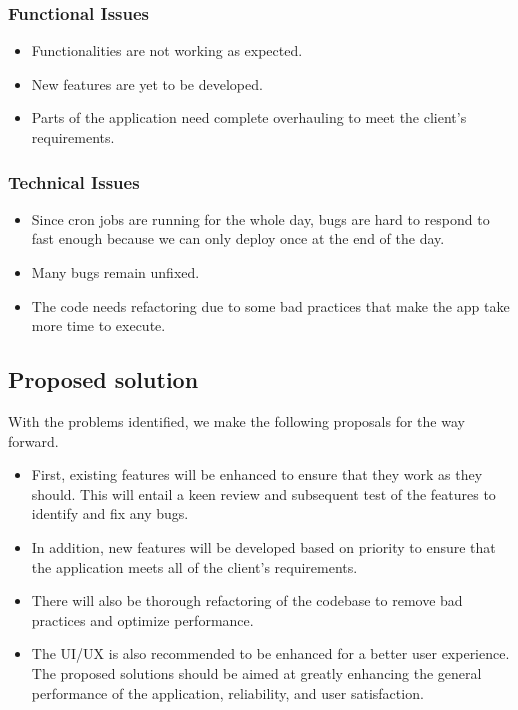\subsubsection{Functional Issues}
\begin{itemize}
    \item Functionalities are not working as expected.
    \item New features are yet to be developed.
    \item Parts of the application need complete overhauling to meet the client's requirements.
\end{itemize}


\newpage
\subsubsection{Technical Issues}
\begin{itemize}
    \item Since cron jobs are running for the whole day, bugs are hard to respond to fast enough because we can only deploy once at the end of the day.
    \item Many bugs remain unfixed.
    \item The code needs refactoring due to some bad practices that make the app take more time to execute.
\end{itemize}

\subsection{Proposed solution}
With the problems identified, we make the following proposals for the way forward.

\begin{itemize}
    \item First, existing features will be enhanced to ensure that they work as they should. This will entail a keen review and subsequent test of the features to identify and fix any bugs.
    \item In addition, new features will be developed based on priority to ensure that the application meets all of the client's requirements.
    \item There will also be thorough refactoring of the codebase to remove bad practices and optimize performance.
    \item The UI/UX is also recommended to be enhanced for a better user experience. The proposed solutions should be aimed at greatly enhancing the general performance of the application, reliability, and user satisfaction.
\end{itemize}
   

